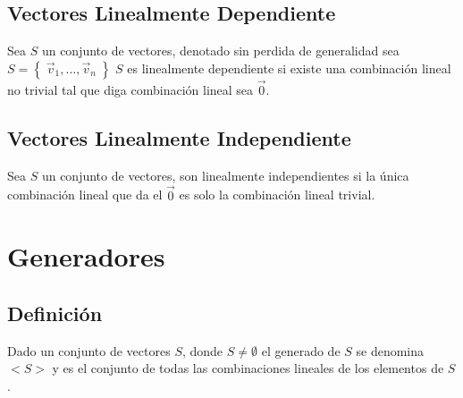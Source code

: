 \documentclass[12pt, fleqn]{report}                             %
\theoremstyle{break}                                            %
\newcommand{\Set}[1]            {\left\{ \; #1 \; \right\}}     %
\begin{document}
            \subsection{Vectores Linealmente Dependiente}

                Sea $S$ un conjunto de vectores, denotado sin perdida de generalidad
                sea $S = \Set{\vec v_1, \dots, \vec v_n}$ $S$ es linealmente dependiente
                si existe una combinación lineal no trivial tal que diga combinación lineal
                sea $\vec 0$.

            \subsection{Vectores Linealmente Independiente}

                Sea $S$ un conjunto de vectores, son linealmente independientes si la
                única combinación lineal que da el $\vec 0$ es solo la combinación lineal
                trivial.



        \clearpage
        \section{Generadores}


            \subsection{Definición}

                Dado un conjunto de vectores $S$, donde $S \neq \emptyset$ el generado
                de $S$ se denomina $<S>$ y es el conjunto de todas las combinaciones lineales
                de los elementos de $S$.
\end{document}

